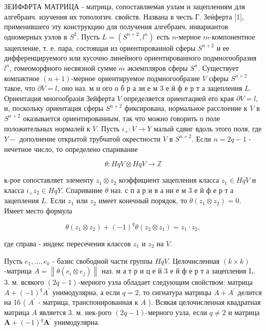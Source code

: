 \documentclass[10pt]{article}
\begin{document}
ЗЕИФФРТА МАТРИЦА - матрица, сопоставляемая узлам и зацеплениям для алгебраич. изучения их топологич. свойств. Названа в честь Г. Зеӥферта [1], применившего эту конструкцию для получения алгебраич. инвариантов одномерных узлов в $S^{3}$. Пусть $L=\left(S^{n+2}, l^{n}\right)$ есть $n$-мерное $m$-компонентное зацепление, т. е. пара, состоящая из ориентированной сферы $S^{n+2}$ и ее дифференцируемого или кусочно линейного ориентированного подмногообразия $l^{n}$, гомеоморфного несвязной сумме $m$ әкземпляров сферы $S^{n}$. Существует компактное $(n+1)$-мерное ориентируемое подмногообразие $V$ сферы $S^{n+2}$ такое, что $\partial V=l$, оно наз. м н ого о б р а зи е м 3 е й ф е р т а зацепления $L$. Ориентация многообразія Зейферта $V$ определяется ориентацией его края $\partial V=l$, и, поскольку ориентация сферы $S^{n+2}$ фиксирована, нормальное расслоение к $V$ в $S^{n+2}$ оказывается ориентированным, так что можно говорить о поле положительных нормалей к $V$. Пусть $i_{+}: V \rightarrow Y$ малый сдвиг вдоль этого поля, где $Y-$ дополнение открытой трубчатой окрестности $V$ в $S^{n+2}$. Если $n=2 q-1$ - нечетное число, то определено спаривание



\[

\theta: H q V \otimes H q V \longrightarrow \mathbb{Z}

\]



к-рое сопоставляет элементу $z_{1} \otimes z_{2}$ коэффициент зацепления класса $z_{1} \in H q V$ и класса $i_{+} z_{2} \in H q Y$. Спаривание $\theta$ наз. с п а р и в а ни е м 3 е й ф е р т а зацепления $L$. Если $z_{1}$ или $z_{2}$ имеет конечный порядок, то $\theta\left(z_{1} \otimes z_{2}\right)=0$. Имеет место формула



\[

\theta\left(z_{1} \otimes z_{2}\right)+(-1)^{q} \theta\left(z_{2} \otimes z_{1}\right)=z_{1} \cdot z_{2},

\]



где справа - индекс пересечения классов $z_{1}$ и $z_{2}$ на $V$.



Пусть $e_{1}, \ldots, e_{k}$ - базис свободной части группы $H q V$. Целочисленная $(k \times k)$-матрица $A=\left\|\theta\left(e_{i} \otimes e_{j}\right)\right\|$ наз. м а т р и ц е й 3 е й ф е р т а зацепления L. 3. м. всякого $(2 q-1)$-мерного узла обладает следующим свойством: матрица $A+(-1)^{q} A^{\prime}$ унимодулярна, а если $q=2$, то сигнатура матрицы $A+A^{\prime}$ делится на 16 ( $A^{\prime}$ - матрица, транспонированная к $A$ ). Всякая целочисленная квадратная матрица $A$ является 3. м. нек-рого $(2 q-1)$-мерного узла, если $q \neq 2$ и матрица $\boldsymbol{A}+(-1)^{q} \boldsymbol{A}^{\prime}$ унимодулярна.
\end{document}
